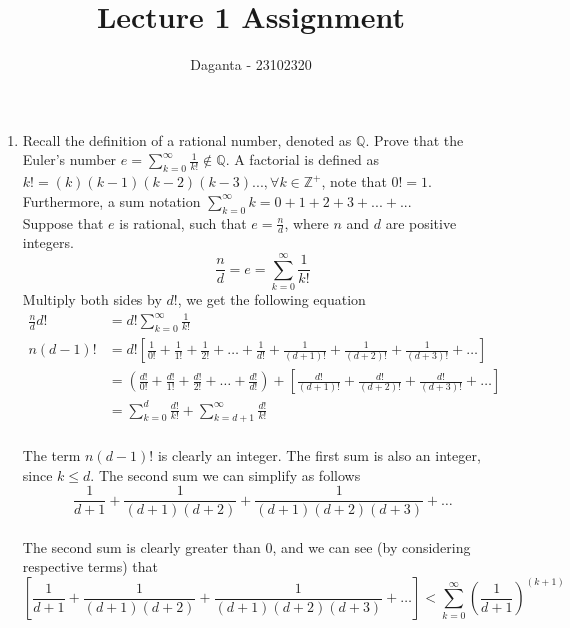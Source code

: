 \documentclass[letterpaper]{article}
\title {Lecture 1 Assignment}
\author {Daganta - 23102320}
\begin{document}
\maketitle
\begin{enumerate}

    \item Recall the definition of a rational number, denoted as $\mathbb{Q}$. 
    Prove that the Euler's number $e=\sum_{k=0}^{\infty} \frac{1}{k!} \notin \mathbb{Q}$. 
    A factorial is defined as $k! = (k)(k-1)(k-2)(k-3)...,\forall k \in \mathbb{Z}^{+}$, note that $0 != 1$. 
    Furthermore, a sum notation $\sum_{k=0}^{\infty} k=0+1+2+3+...+...$\\

        Suppose that $e$ is rational, such that $e = \frac{n}{d}$, where $n$ and $d$ are positive integers.
            $$\frac{n}{d}=e=\sum_{k=0}^{\infty} \frac{1}{k!}$$
        Multiply both sides by $d!$, we get the following equation
            \begin{equation*}
                \begin{split}
                    \frac{n}{d}d! & = d!\sum_{k=0}^{\infty} \frac{1}{k!}                                                                                                                                             \\
                    n(d - 1)!     & = d! \left[\frac{1}{0!} + \frac{1}{1!} + \frac{1}{2!} + \dots + \frac{1}{d!} + \frac{1}{(d+1)!} + \frac{1}{(d+2)!} + \frac{1}{(d+3)!} + \dots \right]                        \\
                                & = \left(\frac{d!}{0!} + \frac{d!}{1!} + \frac{d!}{2!} + \dots + \frac{d!}{d!}\right) + \left[\frac{d!}{(d + 1)!}  + \frac{d!}{(d + 2)!} + \frac{d!}{(d + 3)!} + \dots\right] \\
                                & = \sum_{k=0}^{d} \frac{d!}{k!} + \sum_{k=d+1}^{\infty} \frac{d!}{k!}
                \end{split}
            \end{equation*}  
        \\
        The term $n(d - 1)!$ is clearly an integer. The first sum is also an integer, since $k \leq d$. The second sum we can simplify as follows
                $$\frac{1}{d+1} + \frac{1}{(d+1)(d+2)} + \frac{1}{(d+1)(d+2)(d+3)} + \dots$$
        \\
        The second sum is clearly greater than $0$, and we can see (by considering respective terms) that
            $$\left[\frac{1}{d+1} + \frac{1}{(d+1)(d+2)} + \frac{1}{(d+1)(d+2)(d+3)} + \dots\right] < \sum_{k=0}^{\infty} \left(\frac{1}{d+1}\right)^{(k+1)}$$

\end{enumerate}
\end{document}
